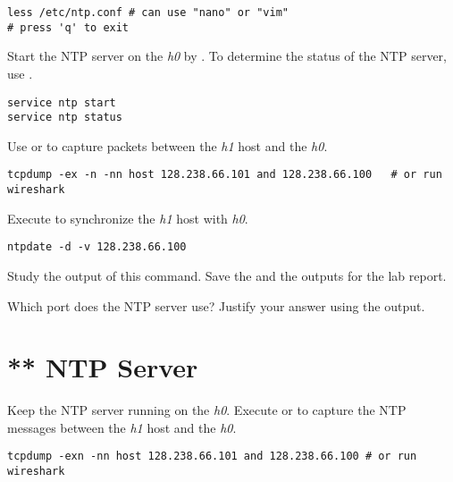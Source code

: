 \documentclass{../UTNetLab}
\begin{document}
\begin{lstlisting}
less /etc/ntp.conf # can use "nano" or "vim"
# press 'q' to exit
\end{lstlisting}

Start the NTP server on the \textit{h0} by .
To determine the status of the NTP server, use .

\begin{lstlisting}
service ntp start
service ntp status
\end{lstlisting}

Use  or  to capture packets between the \textit{h1} host and the \textit{h0}.

\begin{lstlisting}
tcpdump -ex -n -nn host 128.238.66.101 and 128.238.66.100   # or run wireshark
\end{lstlisting}

Execute  to synchronize the \textit{h1} host with \textit{h0}.

\begin{lstlisting}
ntpdate -d -v 128.238.66.100
\end{lstlisting}

Study the output of this command.
Save the  and the  outputs for the lab report.

\begin{report}
    \item Which port does the NTP server use?
    Justify your answer using the  output.
\end{report}

\section{** NTP Server}
Keep the NTP server running on the \textit{h0}.
Execute  or  to capture the NTP messages between the \textit{h1} host and the \textit{h0}.

\begin{lstlisting}
tcpdump -exn -nn host 128.238.66.101 and 128.238.66.100 # or run wireshark
\end{lstlisting}
\end{document}
